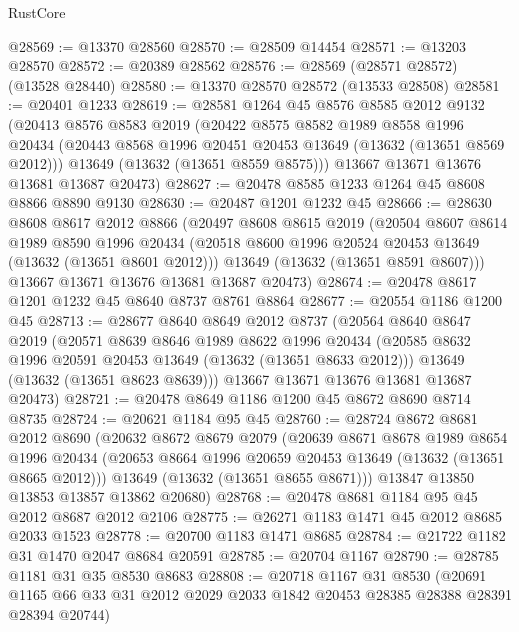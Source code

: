 \begin{lexlean}{RustCore}
\begin{coremodule}
@28569 := @13370 @28560
@28570 := @28509 @14454
@28571 := @13203 @28570
@28572 := @20389 @28562
@28576 := @28569 (@28571 @28572) (@13528 @28440)
@28580 := @13370 @28570 @28572 (@13533 @28508)
@28581 := @20401 @1233
@28619 := @28581
    @1264
    @45
    @8576
    @8585
    @2012
    @9132
    (@20413
      @8576
      @8583
      @2019
      (@20422
        @8575
        @8582
        @1989
        @8558
        @1996
        @20434
        (@20443 @8568 @1996 @20451 @20453 @13649 (@13632 (@13651 @8569 @2012)))
        @13649
        (@13632 (@13651 @8559 @8575)))
      @13667
      @13671
      @13676
      @13681
      @13687
      @20473)
@28627 := @20478 @8585 @1233 @1264 @45 @8608 @8866 @8890 @9130
@28630 := @20487 @1201 @1232 @45
@28666 := @28630
    @8608
    @8617
    @2012
    @8866
    (@20497
      @8608
      @8615
      @2019
      (@20504
        @8607
        @8614
        @1989
        @8590
        @1996
        @20434
        (@20518 @8600 @1996 @20524 @20453 @13649 (@13632 (@13651 @8601 @2012)))
        @13649
        (@13632 (@13651 @8591 @8607)))
      @13667
      @13671
      @13676
      @13681
      @13687
      @20473)
@28674 := @20478 @8617 @1201 @1232 @45 @8640 @8737 @8761 @8864
@28677 := @20554 @1186 @1200 @45
@28713 := @28677
    @8640
    @8649
    @2012
    @8737
    (@20564
      @8640
      @8647
      @2019
      (@20571
        @8639
        @8646
        @1989
        @8622
        @1996
        @20434
        (@20585 @8632 @1996 @20591 @20453 @13649 (@13632 (@13651 @8633 @2012)))
        @13649
        (@13632 (@13651 @8623 @8639)))
      @13667
      @13671
      @13676
      @13681
      @13687
      @20473)
@28721 := @20478 @8649 @1186 @1200 @45 @8672 @8690 @8714 @8735
@28724 := @20621 @1184 @95 @45
@28760 := @28724
    @8672
    @8681
    @2012
    @8690
    (@20632
      @8672
      @8679
      @2079
      (@20639
        @8671
        @8678
        @1989
        @8654
        @1996
        @20434
        (@20653 @8664 @1996 @20659 @20453 @13649 (@13632 (@13651 @8665 @2012)))
        @13649
        (@13632 (@13651 @8655 @8671)))
      @13847
      @13850
      @13853
      @13857
      @13862
      @20680)
@28768 := @20478 @8681 @1184 @95 @45 @2012 @8687 @2012 @2106
@28775 := @26271 @1183 @1471 @45 @2012 @8685 @2033 @1523
@28778 := @20700 @1183 @1471 @8685
@28784 := @21722 @1182 @31 @1470 @2047 @8684 @20591
@28785 := @20704 @1167
@28790 := @28785 @1181 @31 @35 @8530 @8683
@28808 := @20718
    @1167
    @31
    @8530
    (@20691 @1165 @66 @33 @31 @2012 @2029 @2033 @1842 @20453 @28385 @28388 @28391 @28394 @20744)

\end{coremodule}
\end{lexlean}
